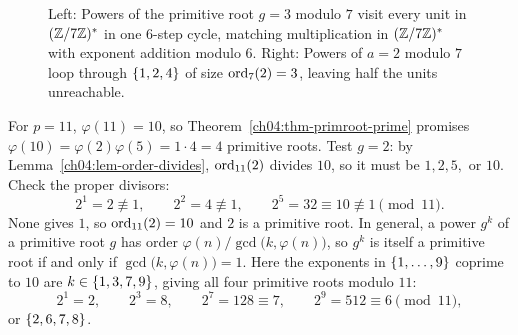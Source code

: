 \begin{figure}[htbp]
\caption{Left: Powers of the primitive root $g = 3$ modulo $7$ visit every unit in $(\mathbb{Z}/7\mathbb{Z})^{*}$ in one $6$-step cycle, matching multiplication in $(\mathbb{Z}/7\mathbb{Z})^{*}$ with exponent addition modulo $6$. Right: Powers of $a = 2$ modulo $7$ loop through $\{1, 2, 4\}$ of size $\operatorname{ord}_7(2) = 3$, leaving half the units unreachable.}
\label{ch04:fig-primroot-clock}
\end{figure}

\begin{example}
\label{ch04:ex-primroot-11}
For $p = 11$, $\varphi(11) = 10$, so Theorem~\ref{ch04:thm-primroot-prime} promises
$\varphi(10) = \varphi(2)\varphi(5) = 1 \cdot 4 = 4$ primitive roots. Test $g = 2$: by
Lemma~\ref{ch04:lem-order-divides}, $\operatorname{ord}_{11}(2)$ divides $10$, so it must be $1, 2, 5,$ or $10$.
Check the proper divisors:
\[
  2^1 = 2 \not\equiv 1, \qquad 2^2 = 4 \not\equiv 1, \qquad 2^5 = 32 \equiv 10 \not\equiv 1 \pmod{11}.
\]
None gives $1$, so $\operatorname{ord}_{11}(2) = 10$ and $2$ is a primitive root. In general, a power $g^k$ of a
primitive root $g$ has order $\varphi(n)/\gcd\bigl(k, \varphi(n)\bigr)$, so $g^k$ is itself a
primitive root if and only if $\gcd\bigl(k, \varphi(n)\bigr) = 1$. Here the exponents in
$\{1,\dots,9\}$ coprime to $10$ are $k \in \{1, 3, 7, 9\}$, giving all four primitive roots
modulo $11$:
\[
  2^1 = 2, \qquad 2^3 = 8, \qquad 2^7 = 128 \equiv 7, \qquad 2^9 = 512 \equiv 6 \pmod{11},
\]
or $\{2, 6, 7, 8\}$.
\end{example}

